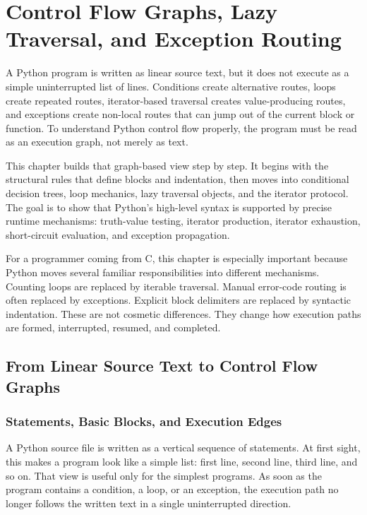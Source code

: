 \documentclass[a4paper,twoside]{report}
\begin{document}
\chapter{Control Flow Graphs, Lazy Traversal, and Exception Routing}

A Python program is written as linear source text, but it does not execute as a simple uninterrupted list of lines. Conditions create alternative routes, loops create repeated routes, iterator-based traversal creates value-producing routes, and exceptions create non-local routes that can jump out of the current block or function. To understand Python control flow properly, the program must be read as an execution graph, not merely as text.

This chapter builds that graph-based view step by step. It begins with the structural rules that define blocks and indentation, then moves into conditional decision trees, loop mechanics, lazy traversal objects, and the iterator protocol. The goal is to show that Python's high-level syntax is supported by precise runtime mechanisms: truth-value testing, iterator production, iterator exhaustion, short-circuit evaluation, and exception propagation.

For a programmer coming from C, this chapter is especially important because Python moves several familiar responsibilities into different mechanisms. Counting loops are replaced by iterable traversal. Manual error-code routing is often replaced by exceptions. Explicit block delimiters are replaced by syntactic indentation. These are not cosmetic differences. They change how execution paths are formed, interrupted, resumed, and completed.

\section{From Linear Source Text to Control Flow Graphs}


\subsection{Statements, Basic Blocks, and Execution Edges}

A Python source file is written as a vertical sequence of statements. At first sight, this makes a program look like a simple list: first line, second line, third line, and so on. That view is useful only for the simplest programs. As soon as the program contains a condition, a loop, or an exception, the execution path no longer follows the written text in a single uninterrupted direction.
\end{document}
